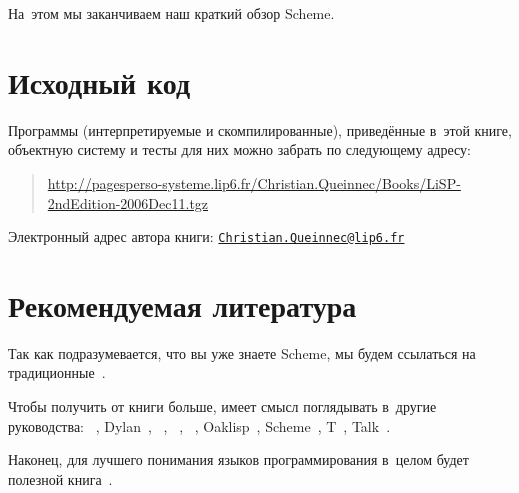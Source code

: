На~этом мы заканчиваем наш краткий обзор Scheme.


\section*{Исходный код}\label{pref/sect:source}

Программы (интерпретируемые и скомпилированные), приведённые в~этой книге,
объектную систему и тесты для них можно забрать по следующему адресу:
\begin{quote}
\url{http://pagesperso-systeme.lip6.fr/Christian.Queinnec/Books/LiSP-2ndEdition-2006Dec11.tgz}
\end{quote}

Электронный адрес автора книги:
\href{mailto:Christian.Queinnec@lip6.fr}{\nolinkurl{Christian.Queinnec@lip6.fr}}


\section*{Рекомендуемая литература}\label{pref/sect:reading}

Так как подразумевается, что вы уже знаете Scheme, мы будем ссылаться на
традиционные~\cite{as85,sf89}.

Чтобы получить от книги больше, имеет смысл поглядывать в~другие руководства:
\CommonLisp~\cite{ste90}, Dylan~\cite{app92b}, \EuLisp~\cite{pe92},
\ISLisp~\cite{iso94}, \LeLisp~\cite{cdd+91}, Oaklisp~\cite{lp88},
Scheme~\cite{kcr98}, T~\cite{ram84}, Talk~\cite{ilo94}.

Наконец, для лучшего понимания языков программирования в~целом будет полезной
книга~\cite{bg94}.{\fnstyle{\RaggedRight}}
